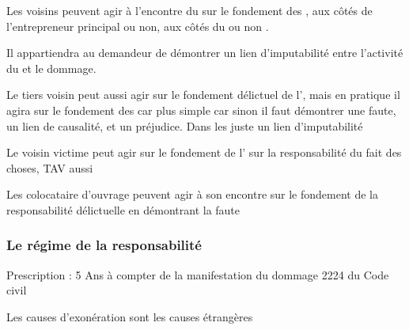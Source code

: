 		Les voisins peuvent agir à l’encontre du \ST sur le fondement des \TAV, aux côtés de l’entrepreneur principal ou non, aux côtés du \MO ou non
.

		Il appartiendra au demandeur de démontrer un lien d’imputabilité entre l’activité du \ST et le dommage.


		\bigbreak Le tiers voisin peut aussi agir sur le fondement délictuel de l', mais en pratique il agira sur le fondement des  \TAV car plus simple car sinon il faut démontrer une faute, un lien de causalité, et un préjudice. Dans les \TAV juste un lien d’imputabilité


		\bigbreak Le voisin victime peut agir sur le fondement de l' sur la responsabilité du fait des choses, TAV aussi

		Les colocataire d’ouvrage peuvent agir à son encontre sur le fondement de la responsabilité délictuelle en démontrant la faute


		\subsubsection{Le régime de la responsabilité}

		Prescription : 5 Ans à compter de la manifestation du dommage 2224 du Code civil

		Les causes d’exonération sont les causes étrangères
